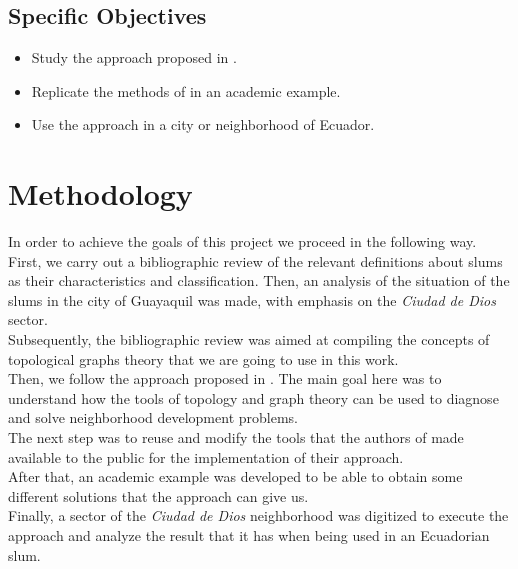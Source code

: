 \documentclass[10pt]{article}
\begin{document}
\subsection{Specific Objectives}
\begin{itemize}
    \item Study the approach proposed in \cite{bre}.
    \item Replicate the methods of \cite{bre} in an academic example.
    \item Use the approach \cite{bre} in a city or neighborhood of Ecuador.
\end{itemize}


\section{Methodology}
In order to achieve the goals of this project we proceed in the following way.\\

First, we carry out a bibliographic review of the relevant definitions about slums as their characteristics and classification. Then, an analysis of the situation of the slums in the city of Guayaquil was made, with emphasis on the \emph{Ciudad de Dios} sector.\\

Subsequently, the bibliographic review was aimed at compiling the concepts of topological graphs theory that we are going to use in this work.\\

Then, we follow the approach proposed in \cite{bre}. The main goal here was to understand how the tools of topology and graph theory can be used to diagnose and solve neighborhood development problems.\\

The next step was to reuse and modify the tools that the authors of \cite{bre} made available to the public for the implementation of their approach.\\

After that, an academic example was developed to be able to obtain some different solutions that the approach can give us.\\

Finally, a sector of the \emph{Ciudad de Dios} neighborhood was digitized to execute the approach and analyze the result that it has when being used in an Ecuadorian slum.\\
\end{document}
